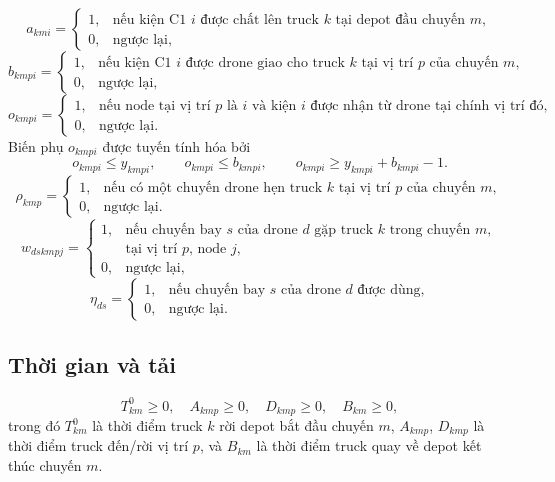 \documentclass[12pt,a4paper]{article}
\begin{document}
\[
a_{kmi}=
\begin{cases}
1, & \text{nếu kiện C1 }i\text{ được chất lên truck }k\text{ tại depot đầu chuyến }m,\\
0, & \text{ngược lại,}
\end{cases}
\]
\[
b_{kmpi}=
\begin{cases}
1, & \text{nếu kiện C1 }i\text{ được drone giao cho truck }k
\text{ tại vị trí }p\text{ của chuyến }m,\\
0, & \text{ngược lại,}
\end{cases}
\]
\[
o_{kmpi}=
\begin{cases}
1, & \text{nếu node tại vị trí }p\text{ là }i\text{ và kiện }i
     \text{ được nhận từ drone tại chính vị trí đó},\\
0, & \text{ngược lại.}
\end{cases}
\]
Biến phụ $o_{kmpi}$ được tuyến tính hóa bởi
\begin{equation}
o_{kmpi}\le y_{kmpi},\qquad
o_{kmpi}\le b_{kmpi},\qquad
o_{kmpi}\ge y_{kmpi}+b_{kmpi}-1.
\end{equation}
\[
\rho_{kmp}=
\begin{cases}
1, & \text{nếu có một chuyến drone hẹn truck }k\text{ tại vị trí }p
\text{ của chuyến }m,\\
0, & \text{ngược lại.}
\end{cases}
\]
\[
w_{dskmpj}=
\begin{cases}
1, & \text{nếu chuyến bay }s\text{ của drone }d\text{ gặp truck }k
      \text{ trong chuyến }m,\\
   & \text{tại vị trí }p\text{, node }j,\\
0, & \text{ngược lại,}
\end{cases}
\]
\[
\eta_{ds}=
\begin{cases}
1, & \text{nếu chuyến bay }s\text{ của drone }d\text{ được dùng,}\\
0, & \text{ngược lại.}
\end{cases}
\]

\subsection{Thời gian và tải}

\[
T^0_{km}\ge0,\quad A_{kmp}\ge0,\quad D_{kmp}\ge0,\quad B_{km}\ge0,
\]
trong đó \(T^0_{km}\) là thời điểm truck \(k\) rời depot bắt đầu chuyến \(m\),
\(A_{kmp}\), \(D_{kmp}\) là thời điểm truck đến/rời vị trí \(p\), và \(B_{km}\)
là thời điểm truck quay về depot kết thúc chuyến \(m\).
\end{document}
